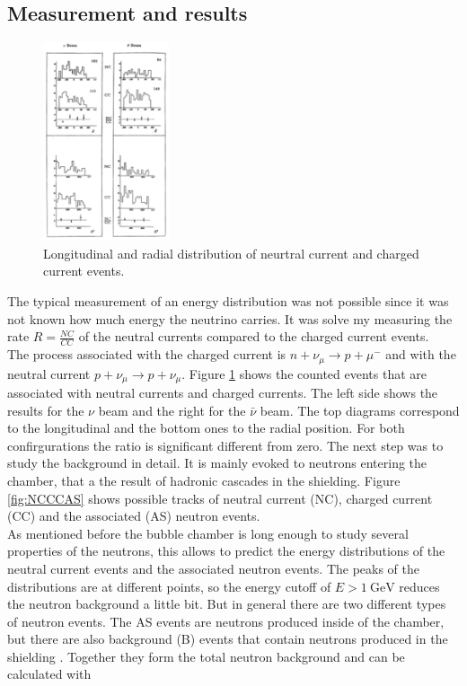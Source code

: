 \subsection{Measurement and results}
\begin{figure}
    \includegraphics[width=0.33\textwidth]{graphics/CC_NC.png}
    \caption{Longitudinal and radial distribution of neurtral current and charged current events.\cite{NC}}
		\label{fig:NCCC}
  \end{figure}
  \FloatBarrier
The typical measurement of an energy distribution was not possible since it was not known how much energy the neutrino carries. It was solve my measuring the rate $R=\frac{NC}{CC}$ of the neutral currents compared to the charged current events.\\
The process associated with the charged current is $n + \nu_{\mu} \rightarrow p + \mu^{-}$ and with the neutral current $p + \nu_{\mu} \rightarrow p + \nu_{\mu}$.
Figure \ref{fig:NCCC} shows the counted events that are associated with neutral currents and charged currents. The left side shows the results for the $\nu$ beam and the right for the $\bar{\nu}$ beam. The top diagrams correspond to the longitudinal and the bottom ones to the radial position. For both confirgurations the ratio is significant different from zero. The next step was to study the background in detail. It is mainly evoked to neutrons entering the chamber, that a the result of hadronic cascades in the shielding. Figure \ref{fig:NCCCAS} shows possible tracks of neutral current (NC), charged current (CC) and the associated (AS) neutron events.\\
As mentioned before the bubble chamber is long enough to study several properties of the neutrons, this allows to predict the energy distributions of the neutral current events and the associated neutron events. The peaks of the distributions are at different points, so the energy cutoff of $E>\SI{1}{\giga\electronvolt}$ reduces the neutron background a little bit. But in general there are two different types of neutron events. The AS events are neutrons produced inside of the chamber, but there are also background (B) events that contain neutrons produced in the shielding \cite{NC_J}. Together they form the total neutron background and can be calculated with
